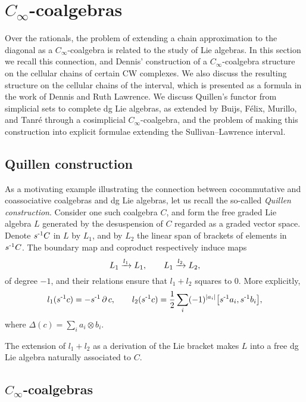
\section{\texorpdfstring{$C_\infty$}{C-infty}-coalgebras} \label{s:rationally}

Over the rationals, the problem of extending a chain approximation to the diagonal as a $C_\infty$-coalgebra is related to the study of Lie algebras.
In this section we recall this connection, and Dennis' construction of a $C_\infty$-coalgebra structure on the cellular chains of certain CW complexes.
We also discuss the resulting structure on the cellular chains of the interval, which is presented as a formula in the work of Dennis and Ruth Lawrence.
We discuss Quillen's functor from simplicial sets to complete dg Lie algebras, as extended by Buijs, F{\'e}lix, Murillo, and Tanr{\'e} through a cosimplicial $C_\infty$-coalgebra, and the problem of making this construction into explicit formulae extending the Sullivan--Lawrence interval.

\subsection{Quillen construction}

As a motivating example illustrating the connection between cocommutative and coassociative coalgebras and dg Lie algebras, let us recall the so-called \textit{Quillen construction}.
Consider one such coalgebra $C$, and form the free graded Lie algebra $L$ generated by the desuspension of $C$ regarded as a graded vector space.
Denote $s^{\mbox{\scriptsize -1}}C$ in $L$ by $L_1$, and by $L_2$ the linear span of brackets of elements in $s^{\mbox{\scriptsize -1}}C$.
The boundary map and coproduct respectively induce maps
\[
L_1 \xrightarrow{l_1} L_1,
\qquad
L_1 \xrightarrow{l_2} L_2,
\]
of degree $-1$, and their relations ensure that $l_1 + l_2$ squares to $0$.
More explicitly,
\[
l_1(s^{\mbox{\scriptsize -1}}c) = -s^{\mbox{\scriptsize -1}} \operatorname{\partial} c,
\qquad
l_2(s^{\mbox{\scriptsize -1}}c) = \frac{1}{2} \sum_i (-1)^{\lvert a_i\rvert} \big[ s^{\mbox{\scriptsize -1}}a_i, s^{\mbox{\scriptsize -1}}b_i \big],
\]
where $\Delta(c) = \sum_i a_i \otimes b_i$.

The extension of $l_1 + l_2$ as a derivation of the Lie bracket makes $L$ into a free dg Lie algebra naturally associated to $C$.

\subsection{\texorpdfstring{$C_\infty$}{C-infinity}-coalgebras} \label{ss:c-infty definition}


